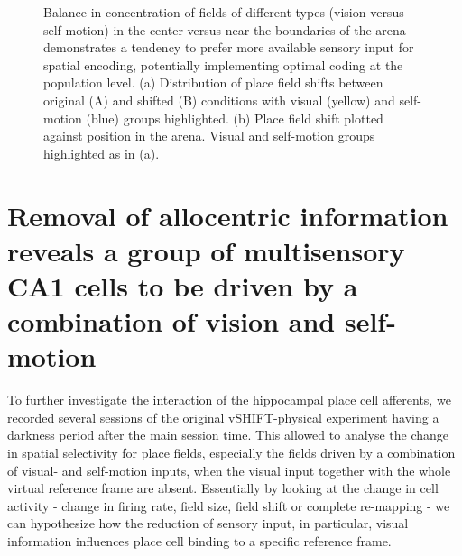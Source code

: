 \begin{figure}
\captionsetup{format=plain}
\caption[Balance between vision and self-motion]{
Balance in concentration of fields of different types (vision versus self-motion) in the center versus near the boundaries of the arena demonstrates a tendency to prefer more available sensory input for spatial encoding, potentially implementing optimal coding at the population level. (a) Distribution of place field shifts between original (A) and shifted (B) conditions with visual (yellow) and self-motion (blue) groups highlighted. (b) Place field shift plotted against position in the arena. Visual and self-motion groups highlighted as in (a).
}
\label{fig:F19_balance_field_concentration}
\end{figure}


\section{Removal of allocentric information reveals a group of multisensory CA1 cells to be driven by a combination of vision and self-motion}
\label{sec:multisensory_integration}

To further investigate the interaction of the hippocampal place cell afferents, we recorded several sessions of the original vSHIFT-physical experiment having a darkness period after the main session time. This allowed to analyse the change in spatial selectivity for place fields, especially the fields driven by a combination of visual- and self-motion inputs, when the visual input together with the whole virtual reference frame are absent. Essentially by looking at the change in cell activity - change in firing rate, field size, field shift or complete re-mapping - we can hypothesize how the reduction of sensory input, in particular, visual information influences place cell binding to a specific reference frame.

